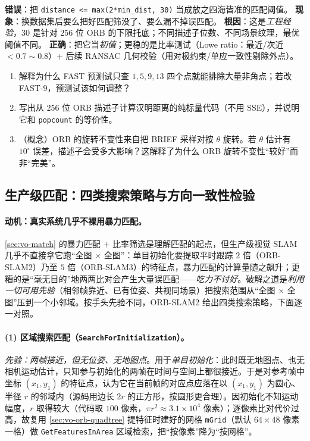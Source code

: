 \begin{pitfall}
\textbf{错误}：把 \texttt{distance <= max(2*min\_dist, 30)} 当成放之四海皆准的匹配阈值。
\textbf{现象}：换数据集后要么把好匹配筛没了、要么漏不掉误匹配。
\textbf{根因}：这是\emph{工程经验}，$30$ 是针对 $256$ 位 ORB 的下限托底；不同描述子位数、不同场景纹理，最优阈值不同。
\textbf{正确}：把它当\emph{初值}；更稳的是比率测试（Lowe ratio：最近/次近 $<0.7\sim0.8$）+ 后续 RANSAC 几何校验（用对极约束/单应一致性剔除外点）。
\end{pitfall}

\begin{practice}
\begin{enumerate}
  \item 解释为什么 FAST 预测试只查 $1,5,9,13$ 四个点就能排除大量非角点；若改 FAST-9，预测试该如何调整？
  \item 写出从 $256$ 位 ORB 描述子计算汉明距离的纯标量代码（不用 SSE），并说明它和 \texttt{popcount} 的等价性。
  \item （概念）ORB 的旋转不变性来自把 BRIEF 采样对按 $\theta$ 旋转。若 $\theta$ 估计有 $10^\circ$ 误差，描述子会受多大影响？这解释了为什么 ORB 旋转不变性“较好”而非“完美”。
\end{enumerate}
\end{practice}

\subsection{生产级匹配：四类搜索策略与方向一致性检验}
\label{sec:vo-match-strategies}

\paragraph{动机：真实系统几乎不裸用暴力匹配。}
\cref{sec:vo-match} 的暴力匹配 $+$ 比率筛选是理解匹配的起点，但生产级视觉 SLAM 几乎不直接拿它跑“全图 $\times$ 全图”：单目初始化要提取平时跟踪 $2$ 倍（ORB-SLAM2）乃至 $5$ 倍（ORB-SLAM3）的特征点，暴力匹配的计算量随之飙升；更糟的是“毫无目的”地两两比对会产生大量误匹配——\emph{吃力不讨好}\cite{murartal2017orbslam2}。破解之道是\emph{利用一切可用先验}（相邻帧靠近、已有位姿、共视同场景）把搜索范围从“全图 $\times$ 全图”压到一个小邻域。按手头先验不同，ORB-SLAM2 给出四类搜索策略，下面逐一对照。

\paragraph{(1) 区域搜索匹配（\texttt{SearchForInitialization}）。}
\emph{先验：两帧接近，但无位姿、无地图点}\cite{murartal2017orbslam2}。用于\emph{单目初始化}：此时既无地图点、也无相机运动估计，只知参与初始化的两帧在时间与空间上都很接近。于是对参考帧中坐标 $(x_1,y_1)$ 的特征点，认为它在当前帧的对应点应落在以 $(x_1,y_1)$ 为圆心、半径 $r$ 的邻域内（源码用边长 $2r$ 的正方形，按圆形更合理）。因初始化不知运动幅度，$r$ 取得较大（代码取 $100$ 像素，$\pi r^2\approx 3.1\times 10^4$ 像素）；逐像素比对代价过高，故复用 \cref{sec:vo-orb-quadtree} 提特征时建好的网格 \texttt{mGrid}（默认 $64\times 48$ 像素一格）做 \texttt{GetFeaturesInArea} 区域检索，把“按像素”降为“按网格”。

